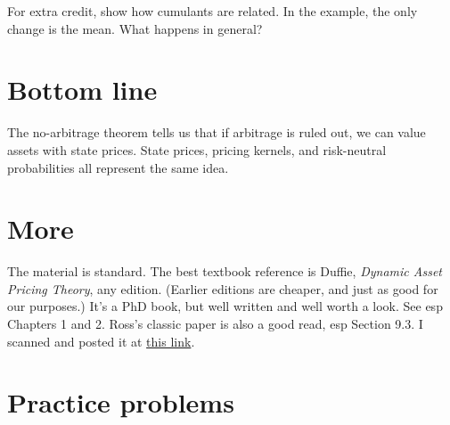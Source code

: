 \documentclass[11pt]{article}
\begin{document}
For extra credit, show how cumulants are related.
In the example, the only change is the mean.
What happens in general?


\section*{Bottom line}

The no-arbitrage theorem tells us that if arbitrage is ruled out,
we can value assets with state prices.
State prices, pricing kernels, and risk-neutral probabilities all represent
the same idea.

\section*{More}

The material is standard.
The best textbook reference is Duffie, {\it Dynamic Asset Pricing Theory\/}, any edition.
(Earlier editions are cheaper, and just as good for our purposes.)
It's a PhD book, but well written and well worth a look.
See esp Chapters 1 and 2.
Ross's classic paper is also a good read, esp Section 9.3.
I scanned and posted it at
\href{http://pages.stern.nyu.edu/~dbackus/233/SteveRoss_risk-arb_chapter_1977.pdf}{this link}.


\section*{Practice problems}
\end{document}
